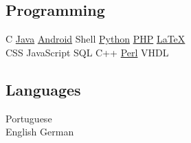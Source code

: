 \documentclass[]{deedy-resume-openfont}
\begin{document}
\begin{minipage}[t]{0.33\textwidth}
\subsection{Programming}
C \textbullet{}
\href{https://www.oracle.com/java/}{Java} \textbullet{}
\href{http://android.com}{Android} \textbullet{}
Shell \textbullet{}
\href{http://www.python.org}{Python}
\href{http://www.php.net}{PHP} \textbullet{}
\href{http://www.latex-project.org}{\LaTeX}\\
CSS \textbullet{}
JavaScript \textbullet{}
SQL \textbullet{}
C++ \textbullet{}
\href{https://www.perl.org/}{Perl}
VHDL
\sectionsep

\subsection{Languages}
Portuguese \\
English \textbullet{}
German


\end{minipage} 
\hfill
\end{document}
